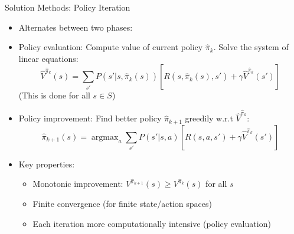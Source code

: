 \documentclass[10pt]{beamer}
\DeclareMathOperator*{\argmax}{argmax} %
\begin{document}
\begin{frame}{Solution Methods: Policy Iteration}
    \begin{itemize}
        \item Alternates between two phases:

        \item Policy evaluation: Compute value of current policy $\hat{\pi}_k$. Solve the system of linear equations:
        \begin{equation}
             \hat{V}^{\hat{\pi}_k}(s) = \sum_{s'} P(s'|s,\hat{\pi}_k(s)) \left[ R(s,\hat{\pi}_k(s),s') + \gamma \hat{V}^{\hat{\pi}_k}(s') \right]
        \end{equation}
         (This is done for all $s \in S$)

        \item Policy improvement: Find better policy $\hat{\pi}_{k+1}$ greedily w.r.t $\hat{V}^{\hat{\pi}_k}$:
        \begin{equation}
            \hat{\pi}_{k+1}(s) = \argmax_a \sum_{s'} P(s'|s,a) \left[ R(s,a,s') + \gamma \hat{V}^{\hat{\pi}_k}(s') \right]
        \end{equation}

        \item Key properties:
        \begin{itemize}
            \item Monotonic improvement: $V^{\hat{\pi}_{k+1}}(s) \geq V^{\hat{\pi}_k}(s)$ for all $s$
            \item Finite convergence (for finite state/action spaces)
            \item Each iteration more computationally intensive (policy evaluation)
        \end{itemize}
    \end{itemize}
\end{frame}

\end{document}

